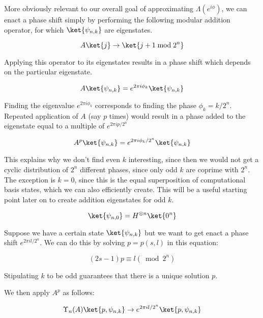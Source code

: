 More obviously relevant to our overall goal of approximating
$\Lambda(e^{i\phi})$, we can enact a phase
shift simply by performing the following modular addition operator, for
which $\ket{\psi_{n,k}}$ are eigenstates.

\begin{equation}
A\ket{j} \rightarrow \ket{j+1 \bmod 2^n}
\end{equation}

Applying this operator to its eigenstates results in a phase shift which
depends on the particular eigenstate.
 
\begin{equation}
A\ket{\psi_{n,k}} = e^{2\pi i \phi_k} \ket{\psi_{n,k}}
\end{equation}

Finding the eigenvalue $e^{2\pi i \phi_k}$ corresponds to finding
the phase $\phi_k = k / 2^n$.
Repeated application of $A$ (say $p$ times) would result in a phase
added to the eigenstate equal to a multiple of $e^{2\pi i p / 2^n}$

\begin{equation}
A^p\ket{\psi_{n,k}} = e^{2\pi i \phi_k / 2^n} \ket{\psi_{n,k}}
\end{equation}

This explains why we don't find even $k$ interesting,
since then we would not get a
cyclic distribution of $2^n$ different phases,
since only odd $k$
are coprime with $2^n$. The exception is $k=0$, since this is the
equal superposition of computational basis states, which we can also
efficiently create. This will be a useful starting point later on to
create addition eigenstates
for odd $k$.

\begin{displaymath}
\ket{\psi_{n,0}} = H^{\otimes n}\ket{0^n}
\end{displaymath}

Suppose we have a certain state $\ket{\psi_{n,k}}$ but we want to get enact
a phase shift $e^{2\pi i l / 2^n}$. We can do this by solving $p=p(s,l)$
in this equation:

\begin{equation}
\label{eqn:psl}
(2s-1)p \equiv l (\bmod 2^n)
\end{equation}

Stipulating $k$ to be odd guarantees that there is a unique solution $p$.

We then apply $A^p$ as follows:

\begin{equation}
\label{eqn:upsilon}
\Upsilon_n(A) \ket{p, \psi_{n,k}} \rightarrow
e^{2\pi i l/2^n} \ket{p, \psi_{n,k}}
\end{equation}

